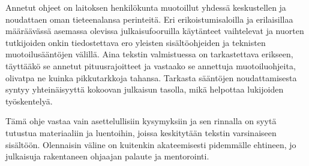 Annetut ohjeet on laitoksen henkilökunta muotoillut yhdessä keskustellen
ja noudattaen oman tieteenalansa perinteitä. Eri erikoistumisaloilla ja
erilaisillaa määräävässä asemassa olevissa julkaisufooruilla käytänteet
vaihtelevat ja nuorten tutkijoiden onkin tiedostettava ero yleisten
sisältöohjeiden ja teknisten muotoilusääntöjen välillä. Aina tekstin
valmistuessa on tarkastettava erikseen, täyttääkö se annetut
pituusrajoitteet ja vastaako se annettuja muotoiluohjeita, olivatpa ne
kuinka pikkutarkkoja tahansa. Tarkasta sääntöjen noudattamisesta syntyy
yhteinäisyyttä kokoovan julkaisun tasolla, mikä helpottaa lukijoiden
työskentelyä.

Tämä ohje vastaa vain asettelullisiin kysymyksiin ja sen rinnalla on
syytä tutustua materiaaliin ja luentoihin, joissa keskitytään tekstin
varsinaiseen sisältöön. Olennaisin väline on kuitenkin akateemisesti
pidemmälle ehtineen, jo julkaisuja rakentaneen ohjaajan palaute ja
mentorointi.

